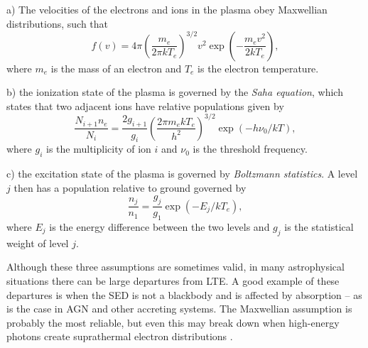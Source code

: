a) The velocities of the electrons and ions in the plasma obey Maxwellian
distributions, such that
\begin{equation}
f(v) = 4 \pi \left( \frac{m_e}{2 \pi kT_e} \right)^{3/2} v^2 
\exp \left( - \frac{m_ev^2}{2kT_e} \right),
\label{eq:maxwellian}
\end{equation}
where $m_e$ is the mass of an electron and $T_e$ is the electron temperature.

\smallskip

b) the ionization state of the plasma is governed by the {\em Saha equation},
which states that two adjacent ions have relative populations given by
\begin{equation}
\frac{N_{i+1}n_e}{N_i} = \frac{2g_{i+1}}{g_i} 
\left( \frac{2 \pi m_e kT_e}{h^2} \right)^{3/2}
\exp(-h \nu_0/kT),
\label{eq:saha}
\end{equation}
where $g_i$ is the multiplicity of ion $i$ and $\nu_0$ is the threshold frequency.

\smallskip

c) the excitation state of the plasma is governed by {\em Boltzmann statistics}.
A level $j$ then has a population relative to ground governed by
\begin{equation}
\frac{n_{j}}{n_1} = \frac{g_j}{g_1} \exp(-E_j/kT_e), 
\label{eq:boltzmann}
\end{equation}
where $E_j$ is the energy difference between the two levels and 
$g_j$ is the statistical weight of level $j$. 

\smallskip

Although these three assumptions are sometimes valid, in many astrophysical situations
there can be large departures from LTE. A good example of these departures is when
the SED is not a blackbody and is affected by absorption -- 
as is the case in AGN and other accreting systems. The Maxwellian assumption 
is probably the most reliable, but even this may break down
when high-energy photons create suprathermal electron distributions 
\citep{humphrey2014}. 

